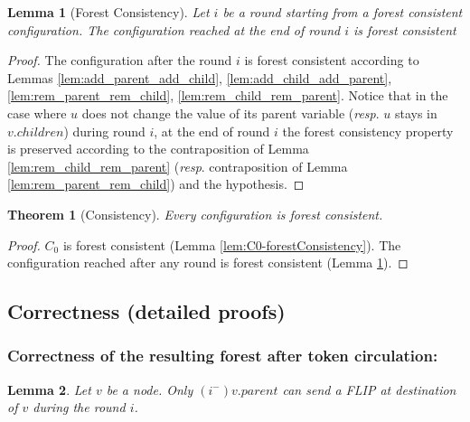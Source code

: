 \documentclass[twocolumn]{article}
\newtheorem{lemma}{Lemma}
\newtheorem{theorem}{Theorem}
\newcommand{\depends}[1]{}
\newcommand{\state}[3]{\ensuremath{(#2^{#3})#1}}
\newcommand{\vim}{\state{v}{i}{-}}
\begin{document}
\begin{lemma}[Forest Consistency]
\label{lem:consistency}
Let $i$ be a round starting from a forest consistent configuration.
The configuration reached at the end of round $i$ is forest consistent
\depends{\ref{lem:add_parent_add_child}, \ref{lem:add_child_add_parent}, \ref{lem:rem_parent_rem_child}, \ref{lem:rem_child_rem_parent}}
\end{lemma}
\begin{proof}
The configuration after the round $i$ is forest consistent according 
to Lemmas \ref{lem:add_parent_add_child}, \ref{lem:add_child_add_parent}, 
\ref{lem:rem_parent_rem_child}, \ref{lem:rem_child_rem_parent}. 
Notice that in the case where $u$ does not change the value of its parent variable (\textit{resp}. 
$u$ stays  in $v.children$) during round $i$, at the end of round $i$ the forest consistency 
property is preserved according to the contraposition of Lemma \ref{lem:rem_child_rem_parent} 
(\textit{resp}. contraposition of Lemma \ref{lem:rem_parent_rem_child}) and the hypothesis.
 \end{proof}

\begin{theorem}[Consistency]
\label{th:consistency}
Every configuration is forest consistent.
\end{theorem}
\begin{proof}
$C_0$ is forest consistent (Lemma \ref{lem:C0-forestConsistency}).
The configuration reached after any round is 
forest consistent (Lemma \ref{lem:consistency}).
 \end{proof}








\subsection{Correctness (detailed proofs)}


\subsubsection{Correctness of the resulting forest after token circulation:}

\begin{lemma}
  \label{lem:single-Flip}
  Let $v$ be a node. Only 
$\vim.parent$ can  send a FLIP at destination of $v$ during the round $i$.
\depends{\ref{th:consistency}, \ref{lem:cond-single-Flip})}
\end{lemma}
\end{document}
